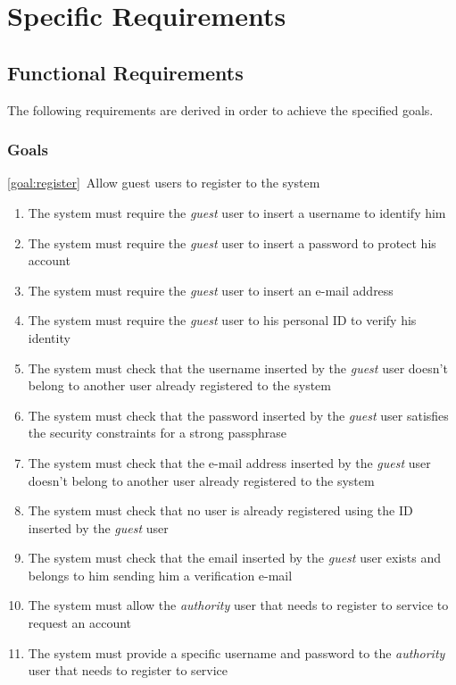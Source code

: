 \section{Specific Requirements}

\subsection{Functional Requirements}
The following requirements are derived in order to achieve the specified goals.
\subsubsection{Goals}
	\begin{description}
		\item \ref{goal:register}\ Allow guest users to register to the system
			\begin{enumerate}[label=\textbf{R\arabic*}]
  				\item The system must require the \emph{guest} user to insert a username to identify him
  				\item The system must require the \emph{guest} user to insert a password to protect his account
  				\item The system must require the \emph{guest} user to insert an e-mail address
  				\item The system must require the \emph{guest} user to his personal ID to verify his identity
   				\item The system must check that the username inserted by the \emph{guest} user doesn't belong to another user already registered to the system 
   				\item The system must check that the password inserted by the \emph{guest} user satisfies the security constraints for a strong passphrase 
   				\item The system must check that the e-mail address inserted by the \emph{guest} user doesn't belong to another user already registered to the system
   				\item The system must check that no user is already registered using the ID inserted by the \emph{guest} user 
   				\item The system must check that the email inserted by the \emph{guest} user exists and belongs to him sending him a verification e-mail
   				\item The system must allow the \emph{authority} user that needs to register to service to request an account
   				\item The system must provide a specific username and password to the \emph{authority} user that needs to register to service 

\end{enumerate}
\end{description}
